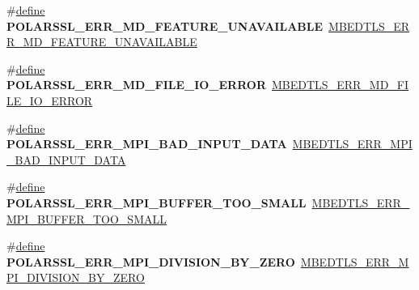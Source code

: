\begin{DoxyCompactItemize}
\item 
\mbox{\label{compat-1_83_8h_ab39743e52520134a277e9141a6098e3e}} 
\#\hyperlink{structdefine}{define} {\bfseries P\+O\+L\+A\+R\+S\+S\+L\+\_\+\+E\+R\+R\+\_\+\+M\+D\+\_\+\+F\+E\+A\+T\+U\+R\+E\+\_\+\+U\+N\+A\+V\+A\+I\+L\+A\+B\+LE}~\hyperlink{md_8h_a121b228f0512def159e3bd4ced07633b}{M\+B\+E\+D\+T\+L\+S\+\_\+\+E\+R\+R\+\_\+\+M\+D\+\_\+\+F\+E\+A\+T\+U\+R\+E\+\_\+\+U\+N\+A\+V\+A\+I\+L\+A\+B\+LE}
\item 
\mbox{\label{compat-1_83_8h_a6a5aabd94dcc264d8a2e4e335eb995c9}} 
\#\hyperlink{structdefine}{define} {\bfseries P\+O\+L\+A\+R\+S\+S\+L\+\_\+\+E\+R\+R\+\_\+\+M\+D\+\_\+\+F\+I\+L\+E\+\_\+\+I\+O\+\_\+\+E\+R\+R\+OR}~\hyperlink{md_8h_aab0a160e4b0efdd4cc8cbe12b4813047}{M\+B\+E\+D\+T\+L\+S\+\_\+\+E\+R\+R\+\_\+\+M\+D\+\_\+\+F\+I\+L\+E\+\_\+\+I\+O\+\_\+\+E\+R\+R\+OR}
\item 
\mbox{\label{compat-1_83_8h_aad5959617396031440786cd8ff24712a}} 
\#\hyperlink{structdefine}{define} {\bfseries P\+O\+L\+A\+R\+S\+S\+L\+\_\+\+E\+R\+R\+\_\+\+M\+P\+I\+\_\+\+B\+A\+D\+\_\+\+I\+N\+P\+U\+T\+\_\+\+D\+A\+TA}~\hyperlink{bignum_8h_a3989a97b1d92d04dd05242731e6f37f2}{M\+B\+E\+D\+T\+L\+S\+\_\+\+E\+R\+R\+\_\+\+M\+P\+I\+\_\+\+B\+A\+D\+\_\+\+I\+N\+P\+U\+T\+\_\+\+D\+A\+TA}
\item 
\mbox{\label{compat-1_83_8h_ab0139fd8e0536a4bd1da18c9ea5bcb84}} 
\#\hyperlink{structdefine}{define} {\bfseries P\+O\+L\+A\+R\+S\+S\+L\+\_\+\+E\+R\+R\+\_\+\+M\+P\+I\+\_\+\+B\+U\+F\+F\+E\+R\+\_\+\+T\+O\+O\+\_\+\+S\+M\+A\+LL}~\hyperlink{bignum_8h_a7fc9b9c20686c88b949d0a35c0def909}{M\+B\+E\+D\+T\+L\+S\+\_\+\+E\+R\+R\+\_\+\+M\+P\+I\+\_\+\+B\+U\+F\+F\+E\+R\+\_\+\+T\+O\+O\+\_\+\+S\+M\+A\+LL}
\item 
\mbox{\label{compat-1_83_8h_a96380f09df1ad46baba97af000b05466}} 
\#\hyperlink{structdefine}{define} {\bfseries P\+O\+L\+A\+R\+S\+S\+L\+\_\+\+E\+R\+R\+\_\+\+M\+P\+I\+\_\+\+D\+I\+V\+I\+S\+I\+O\+N\+\_\+\+B\+Y\+\_\+\+Z\+E\+RO}~\hyperlink{bignum_8h_a97e2c5a552770757da26b4a9b2e56f6c}{M\+B\+E\+D\+T\+L\+S\+\_\+\+E\+R\+R\+\_\+\+M\+P\+I\+\_\+\+D\+I\+V\+I\+S\+I\+O\+N\+\_\+\+B\+Y\+\_\+\+Z\+E\+RO}
\item 
\mbox{\label{compat-1_83_8h_a4f10c6e250b7a06f2fc01ce48a823fc8}} 

\end{DoxyCompactItemize}
